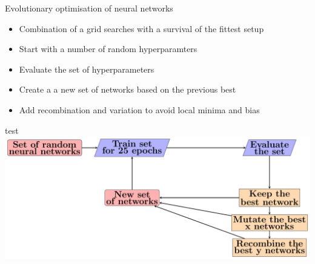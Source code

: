 \begin{frame}{Evolutionary optimisation of neural networks}
    \begin{itemize}
        \item Combination of a grid searches with a survival of the fittest setup
        \vspace{0.2cm}
        \item Start with a number of random hyperparamters
        \vspace{0.2cm}
        \item Evaluate the set of hyperparameters
        \vspace{0.2cm}
        \item Create a a new set of networks based on the previous best
        \vspace{0.2cm}
        \item Add recombination and variation to avoid local minima and bias
    \end{itemize}
\end{frame}

\begin{frame}{test}
\centering \includegraphics[width = \textwidth]{flowchart.pdf}
\end{frame}




